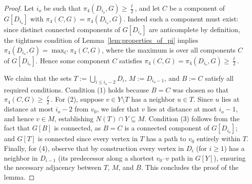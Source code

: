 \begin{proof}
    Let $i_o$ be such that $\pi_4(D_{i_o},G) \geq \frac{\ell}{2}$, and let $C$ be a component of $G[D_{i_o}]$ with $\pi_4(C, G) = \pi_4(D_{i_o},G)$. Indeed such a component must exist: since distinct connected components of $G[D_{i_o}]$ are anticomplete by definition, the tightness condition of Lemma~\ref{lem:properties_of_pi} implies $\pi_4(D_{i_o},G) = \max_C \pi_4(C,G)$, where the maximum is over all components $C$ of $G[D_{i_o}]$. Hence some component $C$ satisfies $\pi_4(C,G) = \pi_4(D_{i_o},G) \geq \frac{\ell}{2}$.

    We claim that the sets $T := \bigcup_{i \leq i_o - 2} D_i$, $M := D_{i_o - 1}$, and $B := C$ satisfy all required conditions. Condition (1) holds because $B = C$ was chosen so that $\pi_4(C, G) \geq \frac{\ell}{2}$. For (2), suppose $v \in Y \setminus T$ has a neighbor $u \in T$. Since $u$ lies at distance at most $i_o - 2$ from $v_0$, we infer that $v$ lies at distance at most $i_o - 1$, and hence $v \in M$, establishing $N(T) \cap Y \subseteq M$. Condition (3) follows from the fact that $G[B]$ is connected, as $B = C$ is a connected component of $G[D_{i_o}]$; and $G[T]$ is connected since every vertex in $T$ has a path to $v_0$ entirely within $T$. Finally, for (4), observe that by construction every vertex in $D_i$ (for $i \geq 1$) has a neighbor in $D_{i - 1}$ (its predecessor along a shortest $v_0$--$v$ path in $G[Y]$), ensuring the necessary adjacency between $T$, $M$, and $B$. This concludes the proof of the lemma. 
\end{proof}


